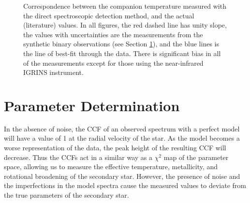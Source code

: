 \documentclass{emulateapj}
\begin{document}
\begin{figure}
{         }
         \caption{Correspondence between the companion temperature measured with the direct spectroscopic detection method, and the actual (literature) values. In all figures, the red dashed line has unity slope, the values with uncertainties are the measurements from the synthetic binary observations (see Section \ref{subsec:systematics}), and the blue lines is the line of best-fit through the data. There is significant bias in all of the measurements except for those using the near-infrared IGRINS instrument.}
         \label{fig:error}
\end{figure}

\section{Parameter Determination}
\label{subsec:systematics}



In the absence of noise, the CCF of an observed spectrum with a perfect model will have a value of 1 at the radial velocity of the star. As the model becomes a worse representation of the data, the peak height of the resulting CCF will decrease. Thus the CCFs act in a similar way as a $\chi^2$ map of the parameter space, allowing us to measure the effective temperature, metallicity, and rotational broadening of the secondary star. However, the presence of noise and the imperfections in the model spectra cause the measured values to deviate from the true parameters of the secondary star. 
\end{document}
